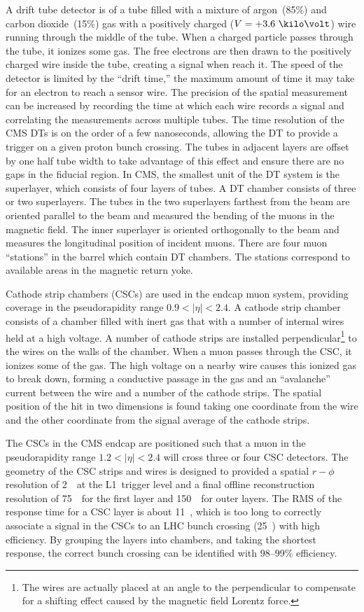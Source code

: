 A drift tube detector is of a tube filled with a mixture of argon~(85\%) and
carbon dioxide~(15\%) gas with a positively charged ($V = +3.6~\kilo\volt$) wire
running through the middle of the tube.  When a charged particle passes through
the tube, it ionizes some gas.  The free electrons are then drawn to the
positively charged wire inside the tube, creating a signal when reach it. The
speed of the detector is limited by the ``drift time,'' the maximum amount of
time it may take for an electron to reach a sensor wire.   The precision of the
spatial measurement can be increased by recording the time at which each wire
records a signal and correlating the measurements across multiple tubes. The
time resolution of the CMS DTs is on the order of a few nanoseconds, allowing
the DT to provide a trigger on a given proton bunch crossing.  The tubes in
adjacent layers are offset by one half tube width to take advantage of this
effect and ensure there are no gaps in the fiducial region.  In CMS, the
smallest unit of the DT system is the superlayer, which consists of four layers
of tubes.  A DT chamber consists of three or two superlayers.  The tubes in the
two superlayers farthest from the beam are oriented parallel to the beam and
measured the bending of the muons in the magnetic field.  The inner superlayer
is oriented orthogonally to the beam and measures the longitudinal position of
incident muons.  There are four muon ``stations'' in the barrel which contain DT
chambers.  The stations correspond to available areas in the magnetic return
yoke.  

Cathode strip chambers (CSCs) are used in the endcap muon system, providing
coverage in the pseudorapidity range $0.9 < |\eta| < 2.4$.  A cathode strip
chamber consists of a chamber filled with inert gas that with a number of
internal wires held at a high voltage.   A number of cathode strips are
installed perpendicular\footnote{The wires are actually placed at an angle to
the perpendicular to compensate for a shifting effect caused by the magnetic
field Lorentz force.} to the wires on the walls of the chamber.  When a
muon passes through the CSC, it ionizes some of the gas.  The high
voltage on a nearby wire causes this ionized gas to break down, forming a
conductive passage in the gas and an ``avalanche'' current between the wire and
a number of the cathode strips.  The spatial position of the hit in two
dimensions is found taking one coordinate from the wire and the other coordinate
from the signal average of the cathode strips.

The CSCs in the CMS endcap are positioned such that a muon in the pseudorapidity
range $1.2 < |\eta| < 2.4$ will cross three or four CSC detectors.  The
geometry of the CSC strips and wires is designed to provided a spatial $r-\phi$
resolution of 2~\milli\meter~at the L1~trigger level and a final offline
reconstruction resolution of 75~\micro\meter~for the first layer and
150~\micro\meter~for outer layers.  The RMS of the response time for a CSC layer
is about 11~\nano\second, which is too long to correctly associate a signal in
the CSCs to an LHC bunch crossing (25~\nano\second) with high efficiency.  By
grouping the layers into chambers, and taking the shortest response, the correct
bunch crossing can be identified with \mbox{98--99\%} efficiency.

